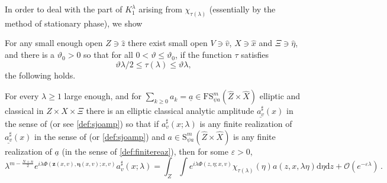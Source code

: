 \documentclass[
	fontsize=11pt, 
	twoside=false, 
	abstract=true, 
	a4paper,
]{scrartcl}
\newcommand{\eps}{\varepsilon}
\newcommand{\dd}{\mathrm{d}}
\newcommand{\ud}[1]{\underline{#1}}
\begin{document}
In order to deal with the part of $K_{1}^\lambda$ arising from $\chi_{\tau(\lambda)}$ (essentially by the method of stationary phase), we show  
\begin{proposition}\label{prop:statapplied}
	For any small enough open $Z\ni \hat z$ there exist small open $V \ni \hat v$, $X\ni \hat x$ and $\Xi \ni \hat \eta$, and there is a $\vartheta_0 > 0$ so that for all $0<\vartheta\leq \vartheta_0$, if the function $\tau$ satisfies 
	\begin{equation}\label{eq:tauK1}
		\vartheta\lambda/2 \leq \tau(\lambda) \leq \vartheta\lambda,
	\end{equation}
	the following holds.

	For every $\lambda \geq 1$ large enough, and for $\sum_{k\geq 0} a_k = \ud{a} \in \mathrm{FS}_{\psi a}^m(\hat Z\times\hat X)$ elliptic and classical in $Z\times X\times\Xi$ there is %
	an elliptic classical analytic amplitude $\ud{a^\sharp_v}(x)$ in the sense of \cite[\S~1]{AST_1982__95__R3_0} (or see \cref{def:sjoamp}) so that if $a^\sharp_v(x;\lambda)$ is any finite realization of $\ud{a^\sharp_v}(x)$ in the sense of \cite[\S~1]{AST_1982__95__R3_0} (or \cref{def:sjoamp}) %
	and $a\in \mathrm{S}^m_{\psi a}(\hat Z\times\hat X)$ is any finite realization of $\ud{a}$ (in the sense of \cref{def:finitereaz}), then for some $\eps>0$,
	\begin{equation}\label{eq:defreala}
		 \lambda^{m-\frac{N+n}{2}} e^{i\lambda \Phi(\mathbf{z}(x,v), \bm{\eta}(x,v);x,v)}a^\sharp_v(x;\lambda) = \int_Z \int e^{i\lambda\Phi(z,\eta;x,v)}\chi_{\tau(\lambda)}(\eta)a(z,x,\lambda\eta)\dd\eta\dd z + \mathcal{O}(e^{-\eps\lambda})\,.
	\end{equation}
%

\end{proposition}
\end{document}
